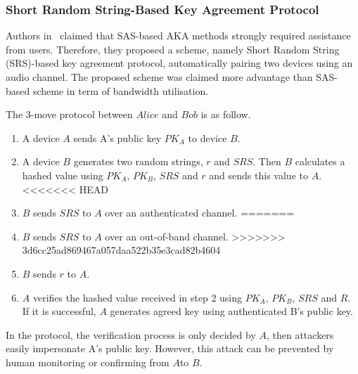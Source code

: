 \begin{enumerate}
\begin{enumerate}
\begin{center}
\end{center}

\subsubsection{Short Random String-Based Key Agreement Protocol}

Authors in~\cite{5678019} claimed that SAS-based AKA methods strongly required assistance from users. Therefore, they proposed a scheme, namely Short Random String (SRS)-based key agreement protocol, automatically pairing two devices using an audio channel. The proposed scheme was claimed more advantage than SAS-based scheme in term of bandwidth utilisation. 

The 3-move protocol between $Alice$ and $Bob$ is as follow.
\begin{enumerate}
\item A device $A$ sends A's public key $PK_A$ to device $B$.
\item A device $B$ generates two random strings, $r$ and $SRS$. Then $B$ calculates a hashed value using $PK_A$, $PK_B$, $SRS$ and $r$ and sends this value to $A$.
<<<<<<< HEAD
\item $B$ sends $SRS$ to $A$ over an authenticated channel. 
=======
\item $B$ sends $SRS$ to $A$ over an out-of-band channel. 
>>>>>>> 3d6cc25ad869467a057daa522b35e3cad82b4604
\item $B$ sends $r$ to $A$.
\item $A$ verifies the hashed value received in step 2 using $PK_A$, $PK_B$, $SRS$ and $R$. If it is successful, $A$ generates agreed key using authenticated B's public key. 
\end{enumerate}

In the protocol, the verification process is only decided by $A$, then attackers easily impersonate A's public key. However, this attack can be prevented by human monitoring or confirming from $A$to $B$. 


\end{enumerate}
\end{enumerate}
